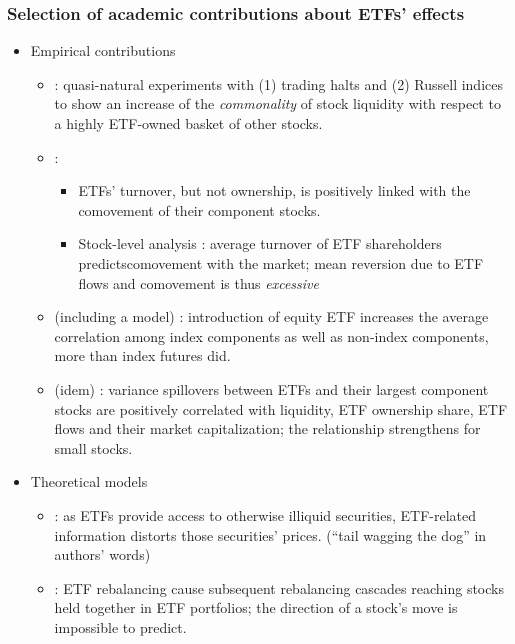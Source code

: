 \documentclass[handout, 9pt, usenames, dvipsnames]{beamer}
\begin{document}
\begin{frame}[allowframebreaks]
  \frametitle{Selection of academic contributions about ETFs' effects}
  \begin{itemize}
  \item Empirical contributions
    \begin{itemize}
    \item \textcite{Agarwal2017} : quasi-natural experiments with (1) trading halts and (2) Russell indices to show an increase of the \emph{commonality} of stock liquidity with respect to a highly ETF-owned basket of other stocks.
    \item \textcite{Da2018} :
      \begin{itemize}
      \item ETFs' turnover, but not ownership, is positively linked with the comovement of their component stocks.
      \item Stock-level analysis : average turnover of ETF shareholders predictscomovement with the market; mean reversion due to ETF flows and comovement is thus \emph{excessive}
      \end{itemize}
    \item \textcite{Leippold2015} (including a model) : introduction of equity ETF increases the average correlation among index components as well as non-index components, more than index futures did.
    \item \textcite{Krause2014} (idem) : variance spillovers between ETFs and their largest component stocks are positively correlated with liquidity, ETF ownership share, ETF flows and their market capitalization; the relationship strengthens for small stocks.
    \end{itemize}
  \item Theoretical models
    \begin{itemize}
    \item \textcite{Bhattacharya2016} : as ETFs provide access to otherwise illiquid securities, ETF-related information distorts those securities' prices. (``tail wagging the dog'' in authors' words)
    \item \textcite{Chinco2016} : ETF rebalancing cause subsequent rebalancing cascades reaching stocks held together in ETF portfolios; the direction of a stock's move is impossible to predict.
    \end{itemize}
  \end{itemize}


\end{frame}
\end{document}

